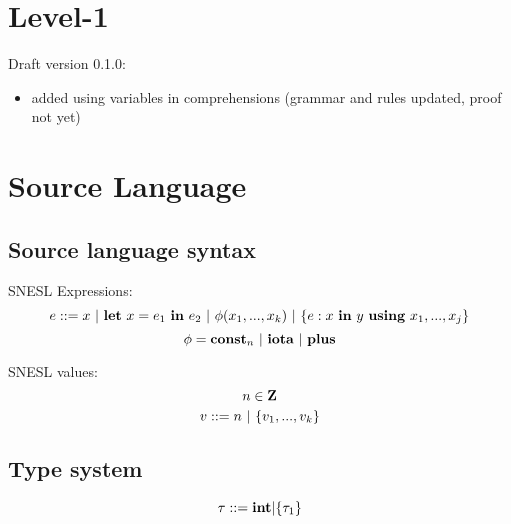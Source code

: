 \def\singl#1{\langle #1 \rangle}
\def\|->{\mapsto}   %
\def\>->{\rightarrowtail} %
\def\=>#1#2{\Rightarrow^{#1}_{#2}}


\def\sfun#1#2{(#1,#2)}

\def\Trans#1#2#3#4#5{#1 \Env #2 \=>{#3}{#4} #5}
\def\Transf#1#2#3#4#5{#1(#2) \=>{#3}{#4} #5}
 
 
\def\S{\mathbf{S}}
\def\Sin{\mathbf{S}_{in}}
\def\Sout{\mathbf{S}_{out}}
\def\FV#1{\mathtt{fv}(#1)}
\def\dv#1{\mathtt{dv}(#1)}


\newcommand{\eq}[2]{\begin{equation}\label{#1} #2\end{equation}}

\providecommand{\versionnumber}{0.1.0}


\section{Level-1}

\def\usevars{x_1,...,x_j}
\def\j#1{(#1)^j_{i=1}}
\def\k#1{(#1)^k_{i=1}}
\def\l#1{(#1)^l_{i=1}}


Draft version \versionnumber: 
\begin{itemize}
    \item added using variables in comprehensions (grammar and rules updated, proof not yet) 
\end{itemize}

\section{Source Language}

\subsection{Source language syntax}
SNESL Expressions:
$$e ::= x \ | \ \Let{x}{e_1}{e_2} \ | \ \hcall{\Tupk{x}} \ | \ \Comp{e}{x}{y}{\usevars} $$
$$\phi = \mathbf{const}_n \ | \ \mathbf{iota} \ | \ \mathbf{plus} $$ 

SNESL values: \\
$$ n \in \mathbf{Z} $$
$$ v::= n \ | \ \{ v_1,...,v_k \}$$

\subsection{Type system}
$$\tau ::= \mathbf{int} | \{\tau_1\}$$

